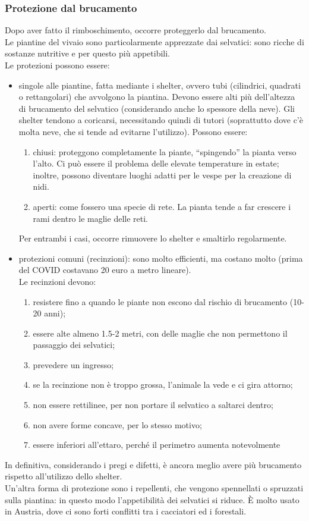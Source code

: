 \subsubsection{Protezione dal brucamento}
Dopo aver fatto il rimboschimento, occorre proteggerlo dal brucamento.\\
Le piantine del vivaio sono particolarmente apprezzate dai selvatici: sono ricche di sostanze nutritive e per questo più appetibili.\\
Le protezioni possono essere:
\begin{itemize}[nosep]
    \item singole alle piantine, fatta mediante i shelter, ovvero tubi (cilindrici, quadrati o rettangolari) che avvolgono la piantina. Devono essere alti più dell'altezza di brucamento del selvatico (considerando anche lo spessore della neve). Gli shelter tendono a coricarsi, necessitando quindi di tutori (soprattutto dove c'è molta neve, che si tende ad evitarne l'utilizzo). Possono essere:
        \begin{enumerate}[nosep]
        \item chiusi: proteggono completamente la piante, ``spingendo'' la pianta verso l'alto. Ci può essere il problema delle elevate temperature in estate; inoltre, possono diventare luoghi adatti per le vespe per la creazione di nidi. 
        \item aperti: come fossero una specie di rete. La pianta tende a far crescere i rami dentro le maglie delle reti. 
        \end{enumerate}
    Per entrambi i casi, occorre rimuovere lo shelter e smaltirlo regolarmente.
    \item protezioni comuni (recinzioni): sono molto efficienti, ma costano molto (prima del COVID costavano 20 euro a metro lineare).\\
    Le recinzioni devono:
    \begin{enumerate}[nosep]
        \item resistere fino a quando le piante non escono dal rischio di brucamento (10-20 anni);
        \item essere alte almeno 1.5-2 metri, con delle maglie che non permettono il passaggio dei selvatici;
        \item prevedere un ingresso;
        \item se la recinzione non è troppo grossa, l'animale la vede e ci gira attorno;
        \item non essere rettilinee, per non portare il selvatico a saltarci dentro;
        \item non avere forme concave, per lo stesso motivo;
        \item essere inferiori all'ettaro, perché il perimetro aumenta notevolmente
    \end{enumerate}
\end{itemize}
In definitiva, considerando i pregi e difetti, è ancora meglio avere più brucamento rispetto all'utilizzo dello shelter.\\
Un'altra forma di protezione sono i repellenti, che vengono spennellati o spruzzati sulla piantina: in questo modo l'appetibilità dei selvatici si riduce. È molto usato in Austria, dove ci sono forti conflitti tra i cacciatori ed i forestali.
